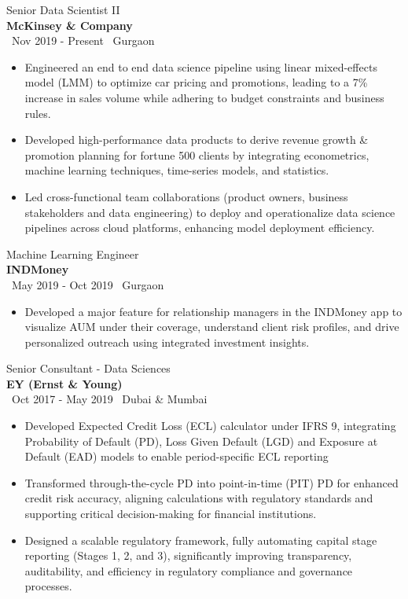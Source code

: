 \documentclass[a4paper,10pt]{article}
\begin{document}
{\large  Senior Data Scientist II} \\
\textbf{McKinsey \& Company} \\
\faCalendar \, Nov 2019 - Present \hfill \faMapMarker \, Gurgaon
\begin{itemize}[itemsep=1pt, topsep=0pt] %
    \item Engineered an end to end data science pipeline using linear mixed-effects model (LMM) to optimize car pricing and promotions, leading to a 7\% increase in sales volume while adhering to budget constraints and business rules.
    \item Developed  high-performance data products to derive revenue growth \& promotion planning for fortune 500 clients by integrating econometrics, machine learning techniques, time-series models, and statistics.
    \item Led cross-functional team collaborations (product owners, business stakeholders and data engineering) to deploy and operationalize data science pipelines across cloud platforms, enhancing model deployment efficiency.

\end{itemize}

{\large Machine Learning Engineer} \\
\textbf{INDMoney} \\
\faCalendar \, May 2019 - Oct 2019 \hfill \faMapMarker \, Gurgaon
\begin{itemize}[itemsep=1pt, topsep=0pt]
    \item Developed a major feature for relationship managers in the INDMoney app to visualize AUM under their coverage, understand client risk profiles, and drive personalized outreach using integrated investment insights.
\end{itemize}

{\large Senior Consultant - Data Sciences} \\
\textbf{EY (Ernst \& Young)} \\
\faCalendar \, Oct 2017 - May 2019 \hfill \faMapMarker \, Dubai \& Mumbai
\begin{itemize}[itemsep=1pt, topsep=0pt]
    \item Developed Expected Credit Loss (ECL) calculator under IFRS 9, integrating Probability of Default (PD), Loss Given Default (LGD) and Exposure at Default (EAD) models to enable period-specific ECL reporting
    \item Transformed through-the-cycle PD into point-in-time (PIT) PD for enhanced credit risk accuracy, aligning calculations with regulatory standards and supporting critical decision-making for financial institutions.
    \item Designed a scalable regulatory framework, fully automating capital stage reporting (Stages 1, 2, and 3), significantly improving transparency, auditability, and efficiency in regulatory compliance and governance processes.
\end{itemize}
\end{document}

